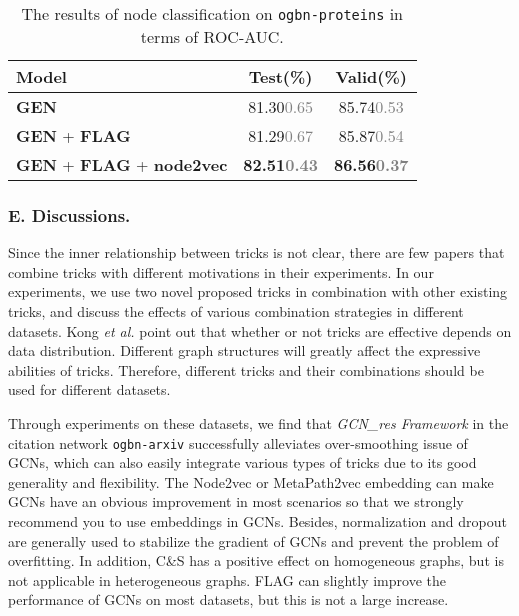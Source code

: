 \documentclass[runningheads]{llncs}
\newcommand{\std}[1]{\textcolor{gray}{\scriptsize{#1}}}
\begin{document}
\begin{table}[htbp] 
\caption{The results of node classification on \texttt{ogbn-proteins} in terms of ROC-AUC. }
\label{table:ogbn-proteins}
\begin{center}
\renewcommand\tabcolsep{7.0pt}
\begin{tabular}{l|c|c}
\hline
\textbf{Model}  & \textbf{Test(\%)} & \textbf{Valid(\%)}  \\
\hline
\hline
\textbf{GEN} \cite{li2020deepergcn,li2019deepgcns} & 81.30\std{0.65} & 85.74\std{0.53} \\
\textbf{GEN} + \textbf{FLAG} & 81.29\std{0.67} & 85.87\std{0.54} \\
\textbf{GEN} + \textbf{FLAG} + \textbf{node2vec} & \textbf{82.51\std{0.43}} & \textbf{86.56\std{0.37}} \\
\hline
\end{tabular}
\end{center} 
\end{table}

\subsubsection{E. Discussions.}
Since the inner relationship between tricks is not clear, there are few
papers that combine tricks with different motivations in their
experiments. In our experiments, we use two novel proposed tricks in
combination with other existing tricks, and discuss the
effects of various combination strategies in different datasets.
Kong \textsl{et al.} \cite{kong2020flag} point out that whether or not tricks are effective
depends on data distribution. Different graph structures will
greatly affect the expressive abilities of tricks.
Therefore, different tricks and their combinations should be used for
different datasets.

Through experiments on these datasets, we find that
\textsl{GCN\_res Framework} in the citation network \texttt{ogbn-arxiv}
successfully alleviates over-smoothing issue of GCNs, which can also 
easily integrate various types of tricks due to its good generality and
flexibility. The Node2vec or MetaPath2vec embedding can
make GCNs have an obvious improvement in most scenarios so that we strongly
recommend you to use embeddings in GCNs. Besides, normalization and dropout are
generally used to stabilize the gradient of GCNs and
prevent the problem of overfitting. In addition, C\&S
has a positive effect on homogeneous graphs, but is not applicable in
heterogeneous graphs. FLAG can slightly improve the performance of
GCNs on most datasets, but this is not a large increase.
\end{document}
